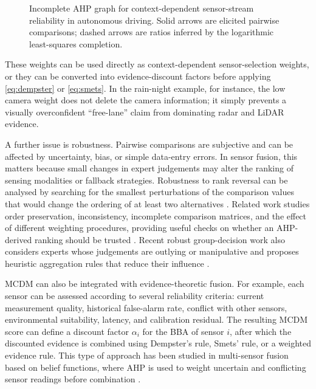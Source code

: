 \documentclass[graybox,envcountchap]{style/SNmono}
\begin{document}
\begin{example}
\begin{figure}[t]
    \caption{Incomplete AHP graph for context-dependent sensor-stream reliability in autonomous driving. Solid arrows are elicited pairwise comparisons; dashed arrows are ratios inferred by the logarithmic least-squares completion.}
    \label{fig:incomplete-ahp-autonomous-driving-example}
\end{figure}

These weights can be used directly as context-dependent sensor-selection weights, or they can be converted into evidence-discount factors before applying \eqref{eq:dempster} or \eqref{eq:smets}. In the rain-night example, for instance, the low camera weight does not delete the camera information; it simply prevents a visually overconfident ``free-lane'' claim from dominating radar and LiDAR evidence. 
\end{example}
\smallskip

A further issue is robustness. Pairwise comparisons are subjective and can be affected by uncertainty, bias, or simple data-entry errors. In sensor fusion, this matters because small changes in expert judgements may alter the ranking of sensing modalities or fallback strategies. Robustness to rank reversal can be analysed by searching for the smallest perturbations of the comparison values that would change the ordering of at least two alternatives \cite{faramondi_robustness_2023}. Related work studies order preservation, inconsistency, incomplete comparison matrices, and the effect of different weighting procedures, providing useful checks on whether an AHP-derived ranking should be trusted \cite{kulakowski_orderpreservation_2015,agoston_csato_inconsistency_2022,csato_agoston_bozoki_2024}. Recent robust group-decision work also considers experts whose judgements are outlying or manipulative and proposes heuristic aggregation rules that reduce their influence \cite{kulakowski_resilient_2024}.

MCDM can also be integrated with evidence-theoretic fusion. For example, each sensor can be assessed according to several reliability criteria: current measurement quality, historical false-alarm rate, conflict with other sensors, environmental suitability, latency, and calibration residual. The resulting MCDM score can define a discount factor \(\alpha_i\) for the BBA of sensor \(i\), after which the discounted evidence is combined using Dempster's rule, Smets' rule, or a weighted evidence rule. This type of approach has been studied in multi-sensor fusion based on belief functions, where AHP is used to weight uncertain and conflicting sensor readings before combination \cite{frikha_ahp_2015}.
\end{document}
